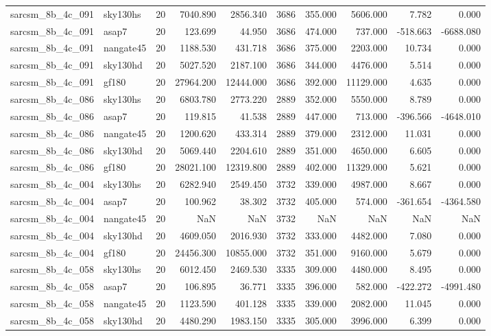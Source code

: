 \documentclass{article}
\begin{document}
\begin{longtable}{llrrrrrrrr}
sarcsm\_8b\_4c\_091 & sky130hs & 20 & 7040.890 & 2856.340 & 3686 & 355.000 & 5606.000 & 7.782 & 0.000 \\
sarcsm\_8b\_4c\_091 & asap7 & 20 & 123.699 & 44.950 & 3686 & 474.000 & 737.000 & -518.663 & -6688.080 \\
sarcsm\_8b\_4c\_091 & nangate45 & 20 & 1188.530 & 431.718 & 3686 & 375.000 & 2203.000 & 10.734 & 0.000 \\
sarcsm\_8b\_4c\_091 & sky130hd & 20 & 5027.520 & 2187.100 & 3686 & 344.000 & 4476.000 & 5.514 & 0.000 \\
sarcsm\_8b\_4c\_091 & gf180 & 20 & 27964.200 & 12444.000 & 3686 & 392.000 & 11129.000 & 4.635 & 0.000 \\
sarcsm\_8b\_4c\_086 & sky130hs & 20 & 6803.780 & 2773.220 & 2889 & 352.000 & 5550.000 & 8.789 & 0.000 \\
sarcsm\_8b\_4c\_086 & asap7 & 20 & 119.815 & 41.538 & 2889 & 447.000 & 713.000 & -396.566 & -4648.010 \\
sarcsm\_8b\_4c\_086 & nangate45 & 20 & 1200.620 & 433.314 & 2889 & 379.000 & 2312.000 & 11.031 & 0.000 \\
sarcsm\_8b\_4c\_086 & sky130hd & 20 & 5069.440 & 2204.610 & 2889 & 351.000 & 4650.000 & 6.605 & 0.000 \\
sarcsm\_8b\_4c\_086 & gf180 & 20 & 28021.100 & 12319.800 & 2889 & 402.000 & 11329.000 & 5.621 & 0.000 \\
sarcsm\_8b\_4c\_004 & sky130hs & 20 & 6282.940 & 2549.450 & 3732 & 339.000 & 4987.000 & 8.667 & 0.000 \\
sarcsm\_8b\_4c\_004 & asap7 & 20 & 100.962 & 38.302 & 3732 & 405.000 & 574.000 & -361.654 & -4364.580 \\
sarcsm\_8b\_4c\_004 & nangate45 & 20 & NaN & NaN & 3732 & NaN & NaN & NaN & NaN \\
sarcsm\_8b\_4c\_004 & sky130hd & 20 & 4609.050 & 2016.930 & 3732 & 333.000 & 4482.000 & 7.080 & 0.000 \\
sarcsm\_8b\_4c\_004 & gf180 & 20 & 24456.300 & 10855.000 & 3732 & 351.000 & 9160.000 & 5.679 & 0.000 \\
sarcsm\_8b\_4c\_058 & sky130hs & 20 & 6012.450 & 2469.530 & 3335 & 309.000 & 4480.000 & 8.495 & 0.000 \\
sarcsm\_8b\_4c\_058 & asap7 & 20 & 106.895 & 36.771 & 3335 & 396.000 & 582.000 & -422.272 & -4991.480 \\
sarcsm\_8b\_4c\_058 & nangate45 & 20 & 1123.590 & 401.128 & 3335 & 339.000 & 2082.000 & 11.045 & 0.000 \\
sarcsm\_8b\_4c\_058 & sky130hd & 20 & 4480.290 & 1983.150 & 3335 & 305.000 & 3996.000 & 6.399 & 0.000 \\

\end{longtable}
\end{document}
